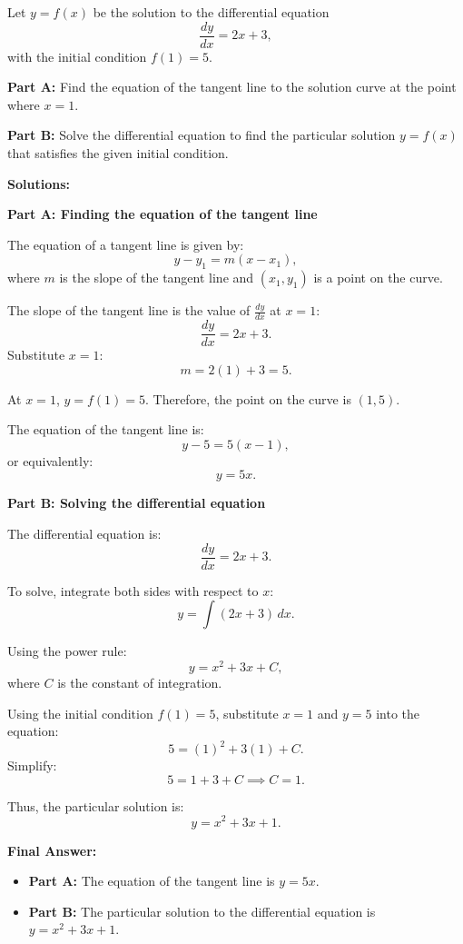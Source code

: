 \documentclass{article}
\begin{document}
\newpage
\begin{tcolorbox}[colback=blue!10, colframe=blue!50!black, title=AP Calculus Problem]
Let \(y = f(x)\) be the solution to the differential equation
\[
\frac{dy}{dx} = 2x + 3,
\]
with the initial condition \(f(1) = 5\).

\textbf{Part A:} Find the equation of the tangent line to the solution curve at the point where \(x = 1\).

\textbf{Part B:} Solve the differential equation to find the particular solution \(y = f(x)\) that satisfies the given initial condition.
\end{tcolorbox}

\textbf{Solutions:}

\textbf{Part A: Finding the equation of the tangent line}

The equation of a tangent line is given by:
\[
y - y_1 = m(x - x_1),
\]
where \(m\) is the slope of the tangent line and \((x_1, y_1)\) is a point on the curve.

The slope of the tangent line is the value of \(\frac{dy}{dx}\) at \(x = 1\):
\[
\frac{dy}{dx} = 2x + 3.
\]
Substitute \(x = 1\):
\[
m = 2(1) + 3 = 5.
\]

At \(x = 1\), \(y = f(1) = 5\). Therefore, the point on the curve is \((1, 5)\).

The equation of the tangent line is:
\[
y - 5 = 5(x - 1),
\]
or equivalently:
\[
y = 5x.
\]

\textbf{Part B: Solving the differential equation}

The differential equation is:
\[
\frac{dy}{dx} = 2x + 3.
\]

To solve, integrate both sides with respect to \(x\):
\[
y = \int (2x + 3) \, dx.
\]

Using the power rule:
\[
y = x^2 + 3x + C,
\]
where \(C\) is the constant of integration.

Using the initial condition \(f(1) = 5\), substitute \(x = 1\) and \(y = 5\) into the equation:
\[
5 = (1)^2 + 3(1) + C.
\]
Simplify:
\[
5 = 1 + 3 + C \implies C = 1.
\]

Thus, the particular solution is:
\[
y = x^2 + 3x + 1.
\]

\textbf{Final Answer:}
\begin{itemize}
    \item \textbf{Part A:} The equation of the tangent line is \(y = 5x\).
    \item \textbf{Part B:} The particular solution to the differential equation is \(y = x^2 + 3x + 1\).
\end{itemize}
\end{document}
